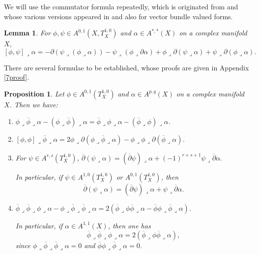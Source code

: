 \documentclass[12pt]{amsart}
\numberwithin{equation}{section}
\newtheorem{proposition}[theorem]{Proposition}
\newtheorem{lemma}  [theorem]     {Lemma}
\renewcommand{\1}{\mathds{1}}
\newcommand{\db}{\overline{\partial}}
\newcommand{\lc}{\lrcorner}
\renewcommand{\>}{\rightarrow}
\newcommand{\p}{\partial}
\def\p{\partial}
\begin{document}
We will use the commutator formula repeatedly, which is originated
from \cite{T,To89} and whose various versions appeared in
\cite{F,BK,Li,LSY,C} and also \cite{LR,lry} for vector bundle valued
forms.
\begin{lemma}\label{aaaa} For $\phi, \psi\in
A^{0,1}(X,T^{1,0}_X)$ and $\alpha\in A^{*,*}(X)$ on a complex
manifold $X$,
\begin{equation}\label{f1}
[\phi,\psi]\lrcorner\alpha=-\p(\psi\lrcorner(\phi
\lrcorner\alpha))-\psi\lrcorner(\phi \lrcorner\p\alpha)
+\phi\lrcorner\p(\psi\lrcorner\alpha)+\psi
\lrcorner\p(\phi\lrcorner\alpha).
\end{equation}
\end{lemma}


There are several formulae to be established, whose proofs are given
in Appendix \ref{7proof}.
\begin{proposition}\label{7for}
Let $\phi \in A^{0,1}(T^{1,0}_X)$ and $\alpha \in A^{p,q}(X)$ on a
complex manifold $X$. Then we have:
\begin{enumerate}[$(1)$]
\item\quad \label{7.1}
$\phi \lc \overline{\phi} \lc \alpha - (\phi \lc \overline{\phi})
\lc \alpha = \overline{\phi} \lc \phi \lc \alpha - (\overline{\phi}
\lc \phi) \lc \alpha$.

\item\quad \label{7.3}
$[\phi,\phi] \lc \overline{\phi}\lc \alpha = 2\phi \lc \p (\phi \lc
\overline{\phi} \lc \alpha) - \phi \lc \phi \lc \p(
\overline{\phi}\lc \alpha)$.



\item\quad \label{7.5}
For $\psi \in A^{r,s}(T^{1,0}_{X})$, $\db (\psi \lc \alpha) = (\db
\psi) \lc \alpha + (-1)^{r+s+1} \psi \lc \db \alpha. $

In particular, if $\psi \in A^{1,0}(T^{1,0}_{X})$ or
$A^{0,1}(T^{1,0}_{X})$, then
$$\db (\psi \lc \alpha) = (\db \psi) \lc \alpha + \psi \lc \db
\alpha. $$


\item\quad \label{7.7}
$\overline{\phi} \lc \overline{\phi} \lc \phi \lc \alpha - \phi \lc
\overline{\phi} \lc \overline{\phi} \lc \alpha = 2 ( \overline{\phi}
\lc \phi \overline{\phi} \lc \alpha - \overline{\phi} \phi \lc
\overline{\phi} \lc \alpha )$.

In particular, if $\alpha \in A^{1,1}(X)$, then one has
\begin{equation*}
\overline{\phi} \lc \overline{\phi} \lc \phi \lc \alpha =
2(\overline{\phi} \lc \phi \overline{\phi} \lc \alpha),
\end{equation*}
since $\phi \lc \overline{\phi} \lc \overline{\phi} \lc \alpha = 0$
and $\overline{\phi} \phi \lc \overline{\phi} \lc \alpha = 0$.
\end{enumerate}
\end{proposition}
\end{document}
